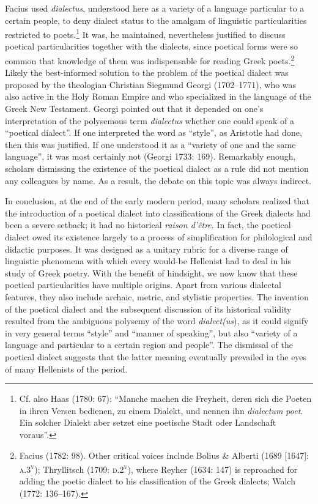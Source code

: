 \documentclass[12pt]{article}
\newenvironment{styleStandard}{\renewcommand\baselinestretch{1.25}\setlength\leftskip{0in}\setlength\rightskip{0in}\setlength\parindent{0.1972in}\setlength\parfillskip{0pt plus 1fil}\setlength\parskip{0in plus 1pt}\writerlistparindent\writerlistleftskip\leavevmode\normalfont\normalsize\writerlistlabel\ignorespaces}{\unskip\vspace{0in plus 1pt}\par}
\newcommand\writerlistleftskip{}
\newcommand\writerlistparindent{}
\newcommand\writerlistlabel{}
\begin{document}
\begin{styleStandard}
Facius used \textit{dialectus}, understood here\textit{ }as\textsc{ }a variety of a language particular to a certain people, to deny dialect status to the amalgam of linguistic particularities restricted to poets.\footnote{ Cf. also Haas (1780: 67): “Manche machen die Freyheit, deren sich die Poeten in ihren Versen bedienen, zu einem Dialekt, und nennen ihn \textit{dialectum poet}. Ein solcher Dialekt aber setzet eine poetische Stadt oder Landschaft voraus”.} It was, he maintained, nevertheless justified to discuss poetical particularities together with the dialects, since poetical forms were so common that knowledge of them was indispensable for reading Greek poets.\footnote{ Facius (1782: 98). Other critical voices include Bolius \& Alberti (1689 [1647]: \textsc{a.3}\textsc{\textsuperscript{v}}); Thryllitsch (1709: \textsc{d.2}\textsc{\textsuperscript{v}}), where Reyher (1634: 147) is reproached for adding the poetic dialect to his classification of the Greek dialects; Walch (1772: 136–167).} Likely the best-informed solution to the problem of the poetical dialect was proposed by the theologian Christian Siegmund Georgi (1702–1771), who was also active in the Holy Roman Empire and who specialized in the language of the Greek New Testament. Georgi pointed out that it depended on one’s interpretation of the polysemous term \textit{dialectus} whether one could speak of a “poetical dialect”. If one interpreted the word as “style”, as Aristotle had done, then this was justified. If one understood it as a “variety of one and the same language”, it was most certainly not (Georgi 1733: 169). Remarkably enough, scholars dismissing the existence of the poetical dialect as a rule did not mention any colleagues by name. As a result, the debate on this topic was always indirect.
\end{styleStandard}

\begin{styleStandard}
In conclusion, at the end of the early modern period, many scholars realized that the introduction of a poetical dialect into classifications of the Greek dialects had been a severe setback; it had no historical \textit{raison d’être}. In fact, the poetical dialect owed its existence largely to a process of simplification for philological and didactic purposes. It was designed as a unitary rubric for a diverse range of linguistic phenomena with which every would-be Hellenist had to deal in his study of Greek poetry. With the benefit of hindsight, we now know that these poetical particularities have multiple origins. Apart from various dialectal features, they also include archaic, metric, and stylistic properties. The invention of the poetical dialect and the subsequent discussion of its historical validity resulted from the ambiguous polysemy of the word \textit{dialect(us}), as it could signify in very general terms “style” and “manner of speaking”, but also “variety of a language and particular to a certain region and people”. The dismissal of the poetical dialect suggests that the latter meaning eventually prevailed in the eyes of many Hellenists of the period.
\end{styleStandard}
\end{document}
